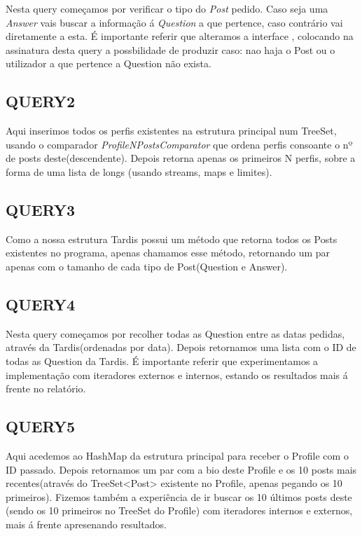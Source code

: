 \documentclass[letterpaper, 10 pt, conference]{IEEEtran}  %
\begin{document}
Nesta query começamos por verificar o tipo do \textit{Post} pedido. Caso seja uma \textit{Answer} vais buscar a informação
á \textit{Question} a que pertence, caso contrário vai diretamente a esta.
É importante referir que alteramos a interface , colocando na assinatura desta query a
possbilidade de produzir  caso: nao haja o Post ou o utilizador a que pertence a Question não exista.


\subsection{QUERY2}

Aqui inserimos todos os perfis existentes na estrutura principal num TreeSet, usando o comparador \textit{ProfileNPostsComparator}
que ordena perfis consoante o nº de posts deste(descendente). Depois retorna apenas os primeiros N
perfis, sobre a forma de uma lista de longs (usando streams, maps e limites).

\subsection{QUERY3}

Como a nossa estrutura Tardis possui um método que retorna todos os Posts existentes no programa, apenas chamamos esse método,
retornando um par apenas com o tamanho de cada tipo de Post(Question e Answer).

\subsection{QUERY4}

Nesta query começamos por recolher todas as Question entre as datas pedidas, através da Tardis(ordenadas por data).
Depois retornamos uma lista com o ID de todas as Question da Tardis.
\newline
É importante referir que experimentamos a implementação com iteradores externos e internos, estando os resultados mais á frente
no relatório.

\subsection{QUERY5}

Aqui acedemos ao HashMap da estrutura principal para receber o Profile com o ID passado. Depois retornamos um par com a bio deste Profile e os
10 posts mais recentes(através do TreeSet<Post> existente no Profile, apenas pegando os 10 primeiros).
Fizemos também a experiência de ir buscar os 10 últimos posts deste (sendo os 10 primeiros no TreeSet do Profile) com
iteradores internos e externos, mais á frente apresenando resultados.
\end{document}
